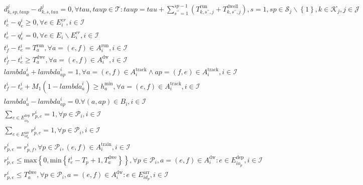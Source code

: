 \begin{align}
  & d_{k , sp , taup}^{j} - d_{k , s , \mathit{tau}}^{j} = 0 , \forall \mathit{tau} , taup \in \mathcal{T} : taup = \mathit{tau} + \sum_{s^{' '} = 1}^{sp - 1} \left(T_{k , s^{' '} , j}^{\text{run}} + T_{k , s^{' '} , j}^{\text{dwell}}\right) , s = 1 , sp \in \mathcal{S}_{j} \backslash \left\{1\right\} , k \in \mathcal{K}_{j} , j \in \mathcal{J} \tag{eq\_0019} \\
  & t_{e}^{i} - q_{e}^{i} \geq 0 , \forall e \in E_{i}^{c r} , i \in \mathcal{I} \tag{eq\_0020} \\
  & t_{e}^{i} - q_{e}^{i} = 0 , \forall e \in E_{i} \backslash E_{i}^{c r} , i \in \mathcal{I} \tag{eq\_0022} \\
  & t_{f}^{i} - t_{e}^{i} = T_{a}^{\text{run}} , \forall a = \left(e , f\right) \in A_{i}^{\text{run}} , i \in \mathcal{I} \tag{eq\_0023} \\
  & t_{f}^{i} - t_{e}^{i} \geq T_{a}^{\text{dwe}} , \forall a = \left(e , f\right) \in A_{i}^{\text{dw}} , i \in \mathcal{I} \tag{eq\_0024} \\
  & \mathit{lambda}_{a}^{i} + \mathit{lambda}_{ap}^{i} = 1 , \forall a = \left(e , f\right) \in A_{i}^{\text{track}} \land ap = \left(f , e\right) \in A_{i}^{\text{track}} , i \in \mathcal{I} \tag{eq\_0025} \\
  & t_{f}^{i} - t_{e}^{i} + M_{1} \left(1 - \mathit{lambda}_{a}^{i}\right) \geq h_{a}^{\text{min}} , \forall a = \left(e , f\right) \in A_{i}^{\text{track}} , i \in \mathcal{I} \tag{eq\_0026} \\
  & \mathit{lambda}_{a}^{i} - \mathit{lambda}_{ap}^{i} = 0 . \forall \left(a , ap\right) \in B_{i} , i \in \mathcal{I} \tag{eq\_0027} \\
  & \underset{e \in E_{i o_{p}}^{\text{dep}}}{\sum} r_{p , e}^{i} = 1 , \forall p \in \mathcal{P}_{i} , i \in \mathcal{I} \tag{eq\_0028} \\
  & \underset{e \in E_{i d_{p}}^{\text{arr}}}{\sum} r_{p , e}^{i} = 1 , \forall p \in \mathcal{P}_{i} , i \in \mathcal{I} \tag{eq\_0030} \\
  & r_{p , e}^{i} = r_{p , f}^{i} , \forall p \in \mathcal{P}_{i} , \left(e , f\right) \in A_{i}^{\text{train}} , i \in \mathcal{I} \tag{eq\_0031} \\
  & r_{p , e}^{i} \leq \text{max} \left\{0 , \text{min} \left\{t_{e}^{i} - T_{p} + 1 , T_{a}^{\text{dwe}}\right\}\right\} , \forall p \in \mathcal{P}_{i} , a = \left(e , f\right) \in A_{i}^{\text{dw}} : e \in E_{i o_{p}}^{\text{dep}} , i \in \mathcal{I} \tag{eq\_0032} \\
  & r_{p , e}^{i} \leq T_{a}^{\text{dwe}} , \forall p \in \mathcal{P}_{i} , a = \left(e , f\right) \in A_{i}^{\text{dw}} : e \in E_{i d_{p}}^{\text{arr}} , i \in \mathcal{I} \tag{eq\_0033} \\

\end{align}

